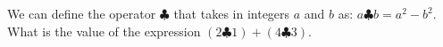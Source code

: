 We can define the operator $\clubsuit$ that takes in integers $a$ and $b$ as: $a\clubsuit b=a^2-b^2$. What is the value of the expression $(2\clubsuit 1)+(4\clubsuit 3)$.
